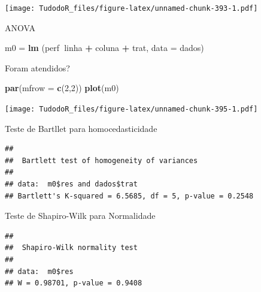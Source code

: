 \documentclass[
]{book}
\newenvironment{Shaded}{\begin{snugshade}}{\end{snugshade}}
\newcommand{\DataTypeTok}[1]{\textcolor[rgb]{0.13,0.29,0.53}{#1}}
\newcommand{\DecValTok}[1]{\textcolor[rgb]{0.00,0.00,0.81}{#1}}
\newcommand{\KeywordTok}[1]{\textcolor[rgb]{0.13,0.29,0.53}{\textbf{#1}}}
\newcommand{\NormalTok}[1]{#1}
\newcommand{\OperatorTok}[1]{\textcolor[rgb]{0.81,0.36,0.00}{\textbf{#1}}}
\newcommand{\StringTok}[1]{\textcolor[rgb]{0.31,0.60,0.02}{#1}}
\begin{document}
\texttt{[image: TudodoR\_files/figure-latex/unnamed-chunk-393-1.pdf]}

ANOVA

\begin{Shaded}
\begin{Highlighting}[]
\NormalTok{m0 =}\StringTok{ }\KeywordTok{lm}\NormalTok{ (perf}\OperatorTok{~}\NormalTok{linha }\OperatorTok{+}\StringTok{ }\NormalTok{coluna }\OperatorTok{+}\StringTok{ }\NormalTok{trat, }\DataTypeTok{data =}\NormalTok{ dados)}
\end{Highlighting}
\end{Shaded}

Foram atendidos?

\begin{Shaded}
\begin{Highlighting}[]
\KeywordTok{par}\NormalTok{(}\DataTypeTok{mfrow =} \KeywordTok{c}\NormalTok{(}\DecValTok{2}\NormalTok{,}\DecValTok{2}\NormalTok{)) }
\KeywordTok{plot}\NormalTok{(m0)}
\end{Highlighting}
\end{Shaded}

\texttt{[image: TudodoR\_files/figure-latex/unnamed-chunk-395-1.pdf]}

Teste de Bartllet para homocedasticidade

\begin{Shaded}
\end{Shaded}

\begin{verbatim}
## 
##  Bartlett test of homogeneity of variances
## 
## data:  m0$res and dados$trat
## Bartlett's K-squared = 6.5685, df = 5, p-value = 0.2548
\end{verbatim}

Teste de Shapiro-Wilk para Normalidade

\begin{Shaded}
\end{Shaded}

\begin{verbatim}
## 
##  Shapiro-Wilk normality test
## 
## data:  m0$res
## W = 0.98701, p-value = 0.9408
\end{verbatim}
\end{document}
